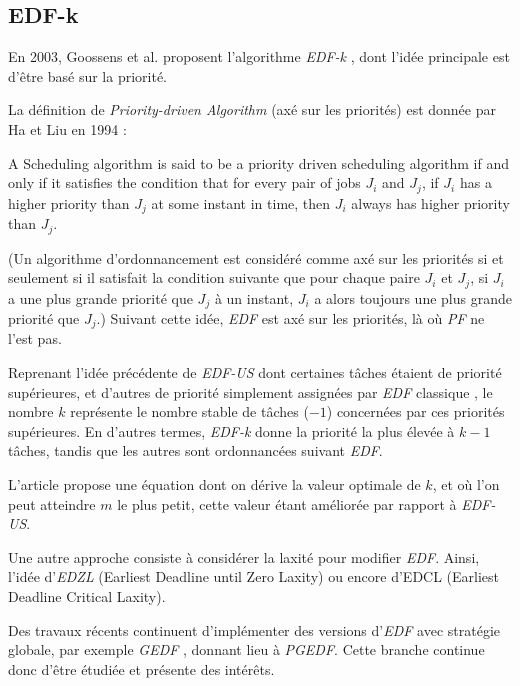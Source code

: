 	
	\subsection{EDF-k}
	En 2003, Goossens et al. proposent l'algorithme \textit{EDF-k} \cite{goossens_priority-driven_2003}, 
	dont l'idée principale est d'être basé sur la priorité. 
	
	La définition de \textit{Priority-driven Algorithm} (axé sur les priorités) 
	est donnée par Ha et Liu en 1994 :
	\begin{mydef}
		A Scheduling algorithm is said to be a priority driven scheduling algorithm if and 
		only if it satisfies the condition 
		that for every pair of jobs $J_i$ and $J_j$, if $J_i$ has a higher priority than $J_j$ at 
		some instant in time, then $J_i$ always has higher priority than $J_j$.
	\end{mydef}
	(Un algorithme d'ordonnancement est considéré comme axé sur les priorités si et seulement si il 
	satisfait la condition suivante que pour chaque paire $J_i$ et $J_j$, si $J_i$ a une plus 
	grande priorité que $J_j$ à un instant, $J_i$ a alors toujours une plus grande priorité 
	que $J_j$.)\newline
	Suivant cette idée, \textit{EDF} est axé sur les priorités, là où \textit{PF} ne l'est pas.\newline
	
	Reprenant l'idée précédente de \textit{EDF-US} dont certaines tâches étaient de priorité 
	supérieures, et d'autres de priorité simplement assignées par \textit{EDF} \og classique\fg{} , 
	le nombre $k$ représente le nombre stable de tâches ($-1$) concernées par ces priorités 
	supérieures. En d'autres termes, \textit{EDF-k} donne la priorité la plus élevée à 
	$k - 1$ tâches, tandis que les autres sont ordonnancées suivant \textit{EDF}.\newline
	
	L'article propose une équation dont on dérive la valeur optimale de $k$, et où l'on peut 
	atteindre $m$ le plus petit, cette valeur étant améliorée par rapport à \textit{EDF-US}.\newline
	
	Une autre approche consiste à considérer la laxité pour modifier \textit{EDF}. 
	Ainsi, l'idée d'\textit{EDZL} (Earliest Deadline until Zero Laxity) \cite{cirinei_edzl_2007} ou encore d'EDCL \cite{kato_real-time_2007}
	(Earliest Deadline Critical Laxity). \newline
	
	Des travaux récents continuent d'implémenter des versions d'\textit{EDF} avec stratégie 
	globale, par exemple \textit{GEDF} \cite{li_global_2015} \cite{nelissen_geoffrey_efficient_2013}, donnant lieu à \textit{PGEDF}. Cette 
	branche continue donc d'être étudiée et présente des intérêts.
	
